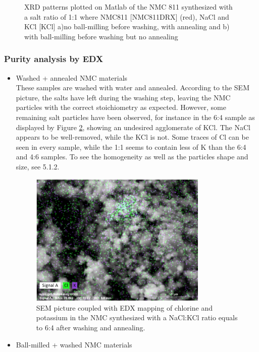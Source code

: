 \documentclass{article}
\begin{document}
\begin{figure}[H]
\begin{minipage}{0.48\textwidth}
    \label{fig:output3}
  \end{minipage}
  \caption{ XRD patterns plotted on Matlab of the NMC 811 synthesized with a salt ratio of 1:1 where NMC811 [NMC811DRX] (red), NaCl and KCl [KCl] a)no ball-milling before washing, with annealing and b) with ball-milling before washing but no annealing}
  \label{XRD}
\end{figure}
\subsubsection {Purity analysis by EDX}
\begin{itemize}
  \item Washed + annealed NMC materials\\
  These samples are washed with water and annealed. According to the SEM picture, the salts have left during the washing step,
   leaving the NMC particles with the correct stoichiometry as expected. However, some remaining salt particles have been observed,
   for instance in the 6:4 sample as displayed by Figure \ref{EDX1}, showing an undesired agglomerate of KCl. The NaCl appears to be well-removed,
   while the KCl is not. Some traces of Cl can be seen in every sample, while the 1:1 seems to contain less of K than the 6:4 and 4:6 samples.
  To see the homogeneity as well as the particles shape and size, see 5.1.2.\\
  \begin{figure}[H]
    \centering
    \includegraphics[width=0.8\textwidth]{EDX1.png}
    \caption{SEM picture coupled with EDX mapping of chlorine and potassium in the NMC synthesized with a NaCl:KCl ratio equals to 6:4 after washing and annealing.}
    \label{EDX1}
  \end{figure}
  \item Ball-milled + washed NMC materials\\

\end{itemize}
\end{document}

